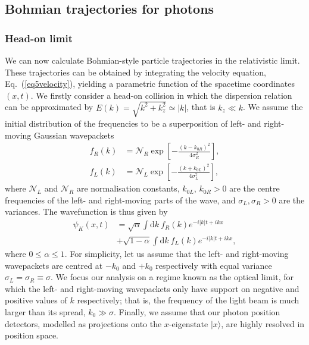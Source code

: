 \documentclass[12pt,prx,
,nofootinbib
,floatfix
,superscriptaddress
]{revtex4-2}
\newcommand{\non}{\nonumber}
\newcommand{\D}{\mathrm{d}}
\begin{document}
\subsection{Bohmian trajectories for photons}\label{sec:trajectories}
\subsubsection{Head-on limit}
We can now calculate Bohmian-style particle trajectories in the relativistic limit. These trajectories can be obtained by integrating the velocity equation, Eq.\ (\ref{eq5velocity}), yielding a parametric function of the spacetime coordinates $(x,t)$. We firstly consider a head-on collision in which the dispersion relation can be approximated by $E(k) = \sqrt{k^2 + k_z^2} \simeq |k|$, that is $k_z \ll k$. We assume the initial distribution of the frequencies to be a superposition of left- and right-moving Gaussian wavepackets 
\begin{align}
    f_R(k) &= \mathcal{N}_R \exp \left[ - \frac{(k-k_{0R})^2}{4\sigma_R^2} \right], \label{f_right} \\
    f_L(k) &= \mathcal{N}_L \exp \left[ - \frac{(k + k_{0L})^2}{4\sigma_L^2} \right], \label{f_left}
\end{align}
where $\mathcal{N}_L$ and $\mathcal{N}_R$ are normalisation constants, $k_{0L}$, $k_{0R}>0$ are the centre frequencies of the left- and right-moving parts of the wave, and $\sigma_L,\sigma_R>0$ are the variances. The wavefunction is thus given by 
\begin{align}\label{11wavefunction}
    \psi_K(x,t) &= \sqrt{\alpha} \int\D k \: f_R(k) e^{-i|k|t + i k x} \non \\
    & + \sqrt{1 - \alpha} \int\D k \:f_L(k) e^{-i|k|t + i k x}, 
\end{align}
where $0\leq \alpha\leq 1$. For simplicity, let us assume that the left- and right-moving wavepackets are centred at $-k_0$ and $+k_0$ respectively with equal variance $\sigma_L = \sigma_R \equiv \sigma$. We focus our analysis on a regime known as the optical limit, for which the left- and right-moving wavepackets only have support on negative and positive values of $k$ respectively; that is, the frequency of the light beam is much larger than its spread, $k_0 \gg \sigma$. Finally, we assume that our photon position detectors, modelled as projections onto the $x$-eigenstate $|x \rangle$, are highly resolved in position space. 
\end{document}

